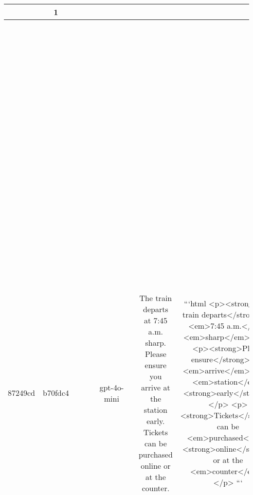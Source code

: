 \begin{table}[h!]
\begin{tabular}{|c|c|c|c|c|c|c|c|c|c|}
{{3. **Use of <em> tags**: Each <p> tag contains <em> tags to emphasize key words and phrases, which is in compliance with the description.

Overall, even though the number of <p> tags and the use of <em> tags comply, the issue with the number of <strong> tags per sentence leads to non-compliance.

ERR & 1\\
\hline
87249cd & b70fdc4 &  &  & gpt-4o-mini & The train departs at 7:45 a.m. sharp. Please ensure you arrive at the station early. Tickets can be purchased online or at the counter. & ```html
<p><strong>The train departs</strong> at <em>7:45 a.m.</em> <em>sharp</em>.</p>
<p><strong>Please ensure</strong> you <em>arrive</em> at the <em>station</em> <strong>early</strong>.</p>
<p><strong>Tickets</strong> can be <em>purchased</em> <strong>online</strong> or at the <em>counter</em>.</p>
``` & ok & The output provided by the chatbot is as follows:

1. There are three sentences, each wrapped in a <p> tag.
2. Each <p> tag contains at least one <strong> tag to emphasize words or phrases.
3. Each <p> tag includes multiple <em> tags to emphasize key words or phrases.

There are a total of three <p> tags, each of which includes both a <strong> tag and multiple <em> tags, fulfilling the requirement stated for sentence structure and tag usage. All necessary rules based on the given description of wrapping sentences and employing emphasis tags have been adhered to.

No violation.
OK & 1\\
\hline
87249cd & b70fdc4 &  &  & gemma2:9b & The train departs at 7:45 a.m. sharp. Please ensure you arrive at the station early. Tickets can be purchased online or at the counter. & <p><strong>The</strong> train departs at <em>7:45</em> a.m. <em>sharp</em>.</p>
<p>Please ensure you arrive at the <em>station</em> <em>early</em>.</p>
<p>Tickets can be purchased <em>online</em> or at the <em>counter</em>.</p> 


Let me know if you'd like to customize the emphasis in any way! & ok & The chatbot's output is evaluated as follows:
- The paragraph has been split into individual sentences, each wrapped in a `<p>` tag.
- The output contains three `<p>` tags, which satisfies the requirement of having at least three `<p>` tags.
- Each `<p>` tag contains at least one `<strong>` tag and multiple `<em>` tags to emphasize key words and phrases.
- The phrases within `<strong>` and `<em>` tags appear to be coherent and fit within a typical sentence structure.

}}
\end{tabular}
\end{table}
